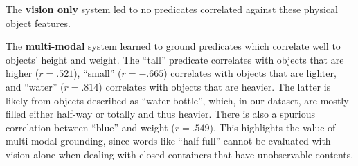 The \textbf{vision only} system led to no predicates correlated against these physical object features.

The \textbf{multi-modal} system learned to ground predicates which correlate well to objects' height and weight.
The ``tall'' predicate correlates with objects that are higher ($r=.521$), ``small'' ($r=-.665$) correlates with objects that are lighter, and ``water'' ($r=.814$) correlates with objects that are heavier.
The latter is likely from objects described as ``water bottle'', which, in our dataset, are mostly filled either half-way or totally and thus heavier.
There is also a spurious correlation between ``blue'' and weight ($r=.549$).
This highlights the value of multi-modal grounding, since words like ``half-full'' cannot be evaluated with vision alone when dealing with closed containers that have unobservable contents.
